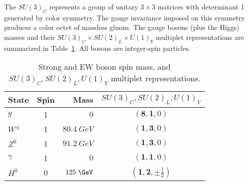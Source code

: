 The $SU(3)_C$ represents a group of unitary $3\times3$ matrices with determinant 1 generated by color symmetry.  The gauge invariance imposed on this symmetry produces a color octet of massless gluons.  The gauge bosons (plus the Higgs) masses and their $SU(3)_{C} \times SU(2)_{L} \times U(1)_{Y}$ multiplet representations are summarized in Table~\ref{tab:boson}.  All bosons are integer-spin particles.      
\begin{table}[!htb]
\centering
\small
\begin{tabular}{|lcrc|}
\hline
State  & Spin & Mass &  $SU(3)_{C}, SU(2)_{L}, U(1)_{Y}$ \\
\hline \hline
$g$ & 1&  $0$ & $(\mathbf{8}, \mathbf{1}, 0)$ \\ 
\hline
$W^\pm$ & 1 & $80.4~GeV$ & $(\mathbf{1}, \mathbf{3}, 0)$  \\  
$Z^0$ & 1 & $91.2~GeV$ & $(\mathbf{1}, \mathbf{3}, 0)$\\ 
$\gamma$ & 1 & $0$ & $(\mathbf{1}, \mathbf{1}, 0)$ \\  
\hline
$H^0$& 0 & $125~\GeV$&$(\mathbf{1}, \mathbf{2}, \pm\frac{1}{2})$\\
\hline 

\hline
\end{tabular}
\caption{Strong and EW boson spin mass, and $SU(3)_{C}, SU(2)_{L}, U(1)_{Y}$ multiplet representations. }
\label{tab:boson}
\end{table} 

